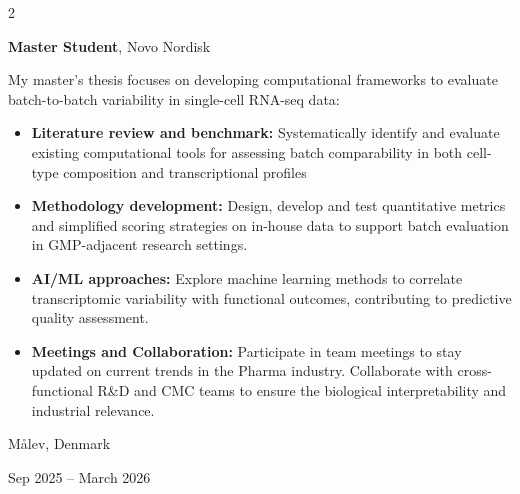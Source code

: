 \documentclass[10pt, letterpaper]{article}
\newenvironment{highlights}{
    \begin{itemize}[
        topsep=0.10 cm,
        parsep=0.10 cm,
        partopsep=0pt,
        itemsep=0pt,
        leftmargin=0.4 cm + 10pt
    ]
}{
    \end{itemize}
}
\newenvironment{twocolentry}[2][]{
    \onecolentry
    \def\secondColumn{#2}
    \setcolumnwidth{\fill, 4.5 cm}
    \begin{paracol}{2}
}{
    \switchcolumn \raggedleft \secondColumn
    \end{paracol}
    \endonecolentry
}
\begin{document}
        \begin{twocolentry}{
    Målev, Denmark

    Sep 2025 -- March 2026
}
    \textbf{Master Student}, Novo Nordisk

    \vspace{0.1cm}

    My master's thesis focuses on developing computational frameworks to evaluate batch-to-batch variability in single-cell RNA-seq data:

    \begin{highlights}
        \item \textbf{Literature review and benchmark:} Systematically identify and evaluate existing computational tools for assessing batch comparability in both cell-type composition and transcriptional profiles

        \vspace{0.1cm}

        \item \textbf{Methodology development:} Design, develop and test quantitative metrics and simplified scoring strategies on in-house data to support batch evaluation in GMP-adjacent research settings.

        \vspace{0.1cm}

        \item \textbf{AI/ML approaches:} Explore machine learning methods to correlate transcriptomic variability with functional outcomes, contributing to predictive quality assessment.

        \vspace{0.1cm}

        \item \textbf{Meetings and Collaboration:} Participate in team meetings to stay updated on current trends in the Pharma industry. Collaborate with cross-functional R\&D and CMC teams to ensure the biological interpretability and industrial relevance.
    \end{highlights}
\end{twocolentry}

        \vspace{0.3 cm}
\end{document}
